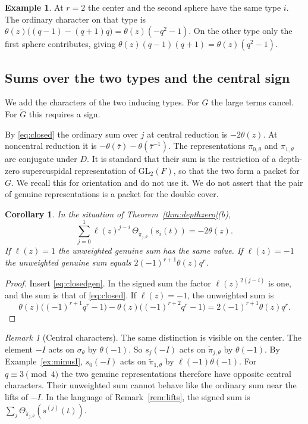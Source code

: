 \documentclass[12pt,letterpaper]{article}
\numberwithin{equation}{section}
\newtheorem{corollary}[theorem]{Corollary}
\theoremstyle{definition}
\newtheorem{example}[theorem]{Example}
\theoremstyle{remark}
\newtheorem{remark}[theorem]{Remark}
\newcommand{\Mp}{\widetilde G}
\begin{document}
\begin{example}
At $r=2$ the center and the second sphere have the same type $i$. The ordinary character on that type is $\theta(z)\bigl((q-1)-(q+1)q\bigr)=\theta(z)(-q^2-1)$. On the other type only the first sphere contributes, giving $\theta(z)(q-1)(q+1)=\theta(z)(q^2-1)$.
\end{example}

\subsection{Sums over the two types and the central sign}
We add the characters of the two inducing types. For $G$ the large terms cancel. For $\Mp$ this requires a sign.

By \eqref{eq:closed} the ordinary sum over $j$ at central reduction is $-2\theta(z)$. At noncentral reduction it is $-\theta(\bar\tau)-\theta(\bar\tau^{-1})$. The representations $\pi_{0,\theta}$ and $\pi_{1,\theta}$ are conjugate under $D$. It is standard that their sum is the restriction of a depth-zero supercuspidal representation of $\mathrm{GL}_2(F)$, so that the two form a packet for $G$. We recall this for orientation and do not use it. We do not assert that the pair of genuine representations is a packet for the double cover.

\begin{corollary}\label{cor:sum}
In the situation of Theorem~\ref{thm:depthzero}(b),
\[
 \sum_{j=0}^1\ell(z)^{j-i}\,
 \Theta_{\widetilde\pi_{j,\theta}}(s_i(t))=-2\theta(z).
\]
If $\ell(z)=1$ the unweighted genuine sum has the same value. If $\ell(z)=-1$ the unweighted genuine sum equals $2(-1)^{r+1}\theta(z)q^r$.
\end{corollary}
\begin{proof}
Insert \eqref{eq:closedgen}. In the signed sum the factor $\ell(z)^{2(j-i)}$ is one, and the sum is that of \eqref{eq:closed}. If $\ell(z)=-1$, the unweighted sum is
\[
 \theta(z)\bigl((-1)^{r+1}q^r-1\bigr)-\theta(z)\bigl((-1)^{r+2}q^r-1\bigr)=2(-1)^{r+1}\theta(z)q^r .
\]
\end{proof}

\begin{remark}[Central characters]
The same distinction is visible on the center. The element $-I$ acts on $\sigma_\theta$ by $\theta(-1)$. So $s_j(-I)$ acts on $\widetilde\pi_{j,\theta}$ by $\theta(-1)$. By Example~\ref{ex:minusI}, $s_0(-I)$ acts on $\widetilde\pi_{1,\theta}$ by $\ell(-1)\theta(-1)$. For $q\equiv3\pmod4$ the two genuine representations therefore have opposite central characters. Their unweighted sum cannot behave like the ordinary sum near the lifts of $-I$. In the language of Remark~\ref{rem:lifts}, the signed sum is $\sum_j\Theta_{\widetilde\pi_{j,\theta}}(s^{(j)}(t))$.
\end{remark}
\end{document}
